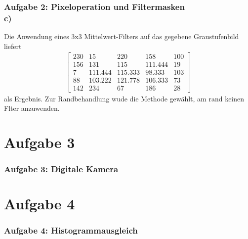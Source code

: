 \documentclass[accentcolor=tud1a,colorbacktitle,inverttitle,landscape,german,presentation,t]{tudbeamer}
\begin{document}
	\begin{frame}
		\frametitle{Aufgabe 2: Pixeloperation und Filtermasken \\ c)}
	
		Die Anwendung eines 3x3 Mittelwert-Filters auf das gegebene Graustufenbild liefert
		\begin{align*}
		\begin{bmatrix}
		230 & 15 & 220 & 158 & 100 \\
		156 & 131 & 115 & 111.444 & 19\\
		7 & 111.444 & 115.333 & 98.333 & 103\\
		88 & 103.222 & 121.778 & 106.333 & 73\\
		142 &234 & 67 & 186 & 28
		\end{bmatrix}
		\end{align*}
		als Ergebnis. Zur Randbehandlung wude die Methode gewählt, am rand keinen Flter anzuwenden.
	\end{frame}

\section{Aufgabe 3}
	\begin{frame}[t]
		\frametitle{Aufgabe 3: Digitale Kamera}

	\end{frame}
\section{Aufgabe 4}
	\begin{frame}[t]
		\frametitle{Aufgabe 4: Histogrammausgleich}
	\end{frame}
\end{document}
